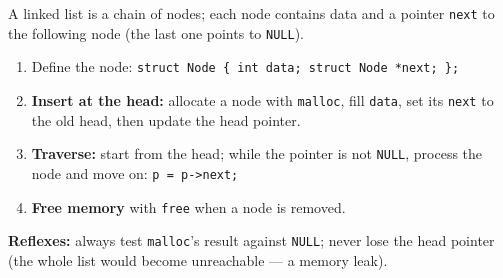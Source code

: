 \documentclass[11pt]{article}
\newcommand{\cle}[1]{{\popxbold\color{popdark}#1}}
\begin{document}
\begin{methode}
A linked list is a chain of \cle{nodes}; each node contains data and a pointer \texttt{next} to the following node (the last one points to \texttt{NULL}).
\begin{enumerate}
\item Define the node: \texttt{struct Node \{ int data; struct Node *next; \};}
\item \textbf{Insert at the head:} allocate a node with \texttt{malloc}, fill \texttt{data}, set its \texttt{next} to the old head, then update the head pointer.
\item \textbf{Traverse:} start from the head; while the pointer is not \texttt{NULL}, process the node and move on: \texttt{p = p->next;}
\item \textbf{Free memory} with \texttt{free} when a node is removed.
\end{enumerate}
\textbf{Reflexes:} always test \texttt{malloc}'s result against \texttt{NULL}; never lose the head pointer (the whole list would become unreachable — a memory leak).
\end{methode}
\end{document}
